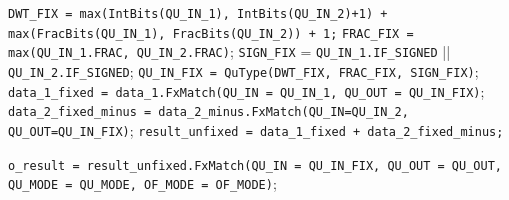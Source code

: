 \documentclass[a4paper, oneside]{report}
\begin{document}
        \begin{algorithm}[H]
            \caption{Module function}
            \BlankLine
            \BlankLine
            
            \texttt{DWT\_FIX = max(IntBits(QU\_IN\_1), IntBits(QU\_IN\_2)+1) + max(FracBits(QU\_IN\_1), FracBits(QU\_IN\_2)) + 1;} 
            \BlankLine
            \texttt{FRAC\_FIX = max(QU\_IN\_1.FRAC, QU\_IN\_2.FRAC)};
            \BlankLine
            \texttt{SIGN\_FIX} = \texttt{QU\_IN\_1.IF\_SIGNED} || \texttt{QU\_IN\_2.IF\_SIGNED};
            \BlankLine
            \texttt{QU\_IN\_FIX = QuType(DWT\_FIX, FRAC\_FIX, SIGN\_FIX)};
            \BlankLine
            \texttt{data\_1\_fixed = data\_1.FxMatch(QU\_IN = QU\_IN\_1, QU\_OUT = QU\_IN\_FIX)};
            \BlankLine
            \texttt{data\_2\_fixed\_minus = data\_2\_minus.FxMatch(QU\_IN=QU\_IN\_2, QU\_OUT=QU\_IN\_FIX)};
            \BlankLine
            \texttt{result\_unfixed = data\_1\_fixed + data\_2\_fixed\_minus;}
            \BlankLine
         
            \texttt{o\_result = result\_unfixed.FxMatch(QU\_IN = QU\_IN\_FIX, QU\_OUT = QU\_OUT, QU\_MODE = QU\_MODE, OF\_MODE = OF\_MODE)};
           
        \end{algorithm}
\end{document}
